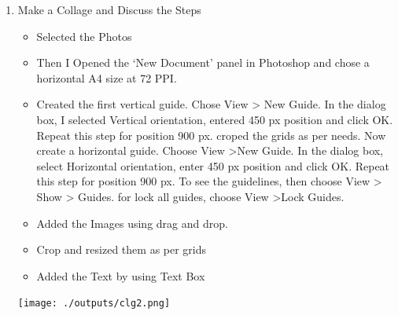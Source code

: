 \documentclass{article}
\newenvironment{problem}{\begin{enumerate}[label=\bfseries\alph*.]\large\bfseries}{\end{enumerate}}
\newenvironment{answered}{\par\normalfont}{}
\begin{document}
\begin{problem}
\begin{answered}
            \end{answered}
        
        \item{Make a Collage and Discuss the Steps}
            \begin{answered}
                \begin{itemize}
                    \item Selected the Photos
                    \item Then I Opened the ‘New Document’ panel in Photoshop and chose a horizontal A4 size at 72 PPI.
                    \item Created the first vertical guide. Chose View > New Guide. In the dialog box, I selected Vertical orientation, entered 450 px position and click OK.  Repeat this step for position 900 px. croped the grids as per needs.
                    Now create a horizontal guide. Choose View >New Guide. In the dialog box, select Horizontal orientation, enter 450 px position and click OK. Repeat this step for position 900 px. To see the guidelines, then choose View > Show > Guides. 
                    for lock all guides, choose View >Lock Guides.
                    \item Added the Images using drag and drop.
                    \item Crop and resized them as per grids
                    \item Added the Text by using Text Box
                \end{itemize}
                \begin{center}\texttt{[image: ./outputs/clg2.png]}\end{center}
            \end{answered}


    \end{problem}
\end{document}
